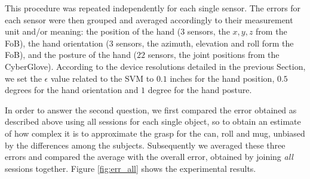 This procedure was repeated independently for each single sensor. The
errors for each sensor were then grouped and averaged accordingly to
their measurement unit and/or meaning: the position of the hand ($3$
sensors, the $x,y,z$ from the FoB), the hand orientation ($3$ sensors,
the azimuth, elevation and roll form the FoB), and the posture of the
hand ($22$ sensors, the joint positions from the
CyberGlove). According to the device resolutions detailed in the
previous Section, we set the $\epsilon$ value related to the SVM
\cite{SmolaTut2004} to $0.1$ inches for the hand position, $0.5$
degrees for the hand orientation and $1$ degree for the hand posture.

In order to answer the second question, we first compared the error
obtained as described above using all sessions for each single object,
so to obtain an estimate of how complex it is to approximate the grasp
for the can, roll and mug, unbiased by the differences among the
subjects. Subsequently we averaged these three errors and compared the
average with the overall error, obtained by joining \emph{all}
sessions together. Figure \ref{fig:err_all} shows the experimental
results.


